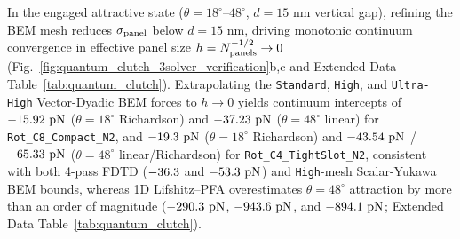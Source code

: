 \documentclass[pdflatex,sn-nature]{sn-jnl}
\DeclareRobustCommand{\roundone}[1]{\fpeval{round(#1,1)}}
\DeclareRobustCommand{\roundtwo}[1]{\fpeval{round(#1,2)}}
\begin{document}
In the engaged attractive state ($\theta=18^\circ\text{--}48^\circ$, $d=15\text{ nm}$ vertical gap), refining the BEM mesh reduces $\sigma_{\rm panel}$ below $d=15\text{ nm}$, driving monotonic continuum convergence in effective panel size $h = N_{\rm panels}^{-1/2} \to 0$ (Fig.~\ref{fig:quantum_clutch_3solver_verification}b,c and Extended Data Table~\ref{tab:quantum_clutch}). Extrapolating the \texttt{Standard}, \texttt{High}, and \texttt{Ultra-High} Vector-Dyadic BEM forces to $h \to 0$ yields continuum intercepts of $\roundtwo{\RotCeightCompactNtwoBemThetaoneeightRichardsonFZPn}\text{ pN}$ ($\theta=18^\circ$ Richardson) and $\roundtwo{\RotCeightCompactNtwoBemThetafoureightContinuumFZPn}\text{ pN}$ ($\theta=48^\circ$ linear) for \texttt{Rot\_C8\_Compact\_N2}, and $\roundtwo{\RotCfourTightslotNtwoBemThetaoneeightRichardsonFZPn}\text{ pN}$ ($\theta=18^\circ$ Richardson) and $\roundtwo{\RotCfourTightslotNtwoBemThetafoureightContinuumFZPn}\text{ pN}$ / $\roundtwo{\RotCfourTightslotNtwoBemThetafoureightRichardsonFZPn}\text{ pN}$ ($\theta=48^\circ$ linear/Richardson) for \texttt{Rot\_C4\_TightSlot\_N2}, consistent with both 4-pass FDTD ($\roundtwo{\RotCeightCompactNtwoMeepThetafoureightFZPn}$ and $\roundtwo{\RotCfourTightslotNtwoMeepThetafoureightFZPn}\text{ pN}$) and \texttt{High}-mesh Scalar-Yukawa BEM bounds, whereas 1D Lifshitz--PFA overestimates $\theta=48^\circ$ attraction by more than an order of magnitude ($\roundone{\RotCeightCompactNtwoHighThetaZerofoureightpzeroLifshitzPfaFZPn}\text{ pN}$, $\roundone{\RotCfourTightslotNtwoHighThetaZerofoureightpzeroLifshitzPfaFZPn}\text{ pN}$, and $\roundone{\RotConezeroFractalNthreeHighThetaZerofoureightpzeroLifshitzPfaFZPn}\text{ pN}$; Extended Data Table~\ref{tab:quantum_clutch}).
\end{document}

